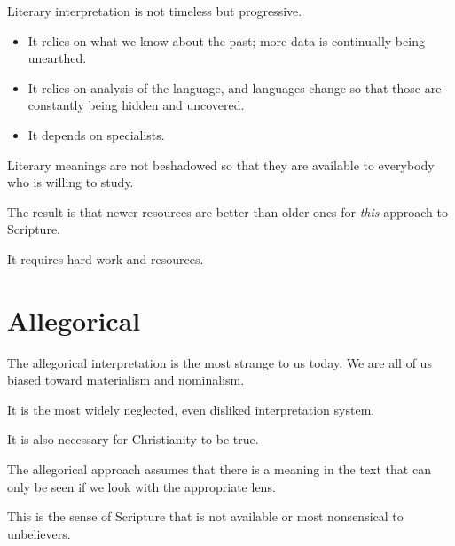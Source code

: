 \documentclass{beamer}
\begin{document}
\begin{frame}
  Literary interpretation is not timeless but progressive.\pause
  \begin{itemize}
	\item It relies on what we know about the past; more data is continually being unearthed.\pause
	\item It relies on analysis of the language, and languages change so that those are constantly being hidden and uncovered.\pause
	\item It depends on specialists.
  \end{itemize}
\end{frame}

\begin{frame}
  Literary meanings are not beshadowed so that they are available to everybody who is willing to study.
\end{frame}

\begin{frame}
  The result is that newer resources are better than older ones for \emph{this} approach to Scripture.
\end{frame}

\begin{frame}
  It requires hard work and resources.
\end{frame}

\section{Allegorical}

\begin{frame}
  The allegorical interpretation is the most strange to us today.
  We are all of us biased toward materialism and nominalism.
\end{frame}

\begin{frame}
  It is the most widely neglected, even disliked interpretation system.
\end{frame}

\begin{frame}
  It is also necessary for Christianity to be true.
\end{frame}

\begin{frame}
  The allegorical approach assumes that there is a meaning in the text that can only be seen if we look with the appropriate lens.
\end{frame}

\begin{frame}
  This is the sense of Scripture that is not available or most nonsensical to unbelievers.
\end{frame}
\end{document}
